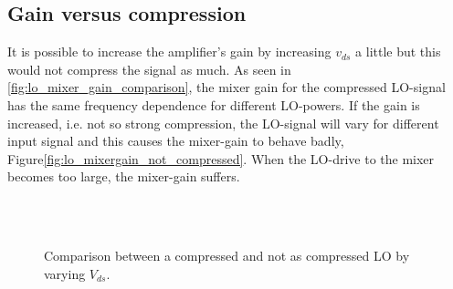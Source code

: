 			
			
	\subsection{Gain versus compression}
		It is possible to increase the amplifier's gain by increasing $v_{ds}$ a little but this would not compress the signal as much. As seen in \autoref{fig:lo_mixer_gain_comparison}, the mixer gain for the compressed LO-signal has the same frequency dependence for different LO-powers. If the gain is increased, i.e. not so strong compression, the LO-signal will vary for different input signal and this causes the mixer-gain to behave badly, Figure\autoref{fig:lo_mixergain_not_compressed}. When the LO-drive to the mixer becomes too large, the mixer-gain suffers.
	
	
				\begin{figure}[hpt!]
					\centering 
					 \\
					 \\					
					\caption{Comparison between a compressed and not as compressed LO by varying $V_{ds}$.}\label{fig:lo_mixer_gain_comparison}
				\end{figure}	
	
	


